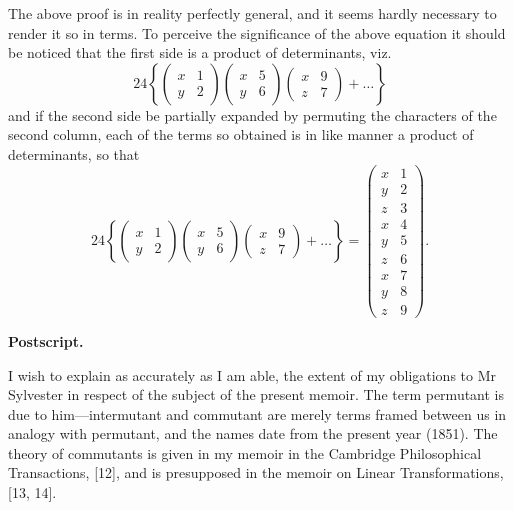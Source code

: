 \documentclass[11pt,a4paper]{article}
\theoremstyle{plain}
\begin{document}
The above proof is in reality perfectly general, and it seems hardly necessary to render it so in terms. To perceive the significance of the above equation it should be noticed that the first side is a product of determinants, viz.
\[24 \left\{ \begin{pmatrix} x & 1 \\ y & 2 \end{pmatrix} \begin{pmatrix} x & 5 \\ y & 6 \end{pmatrix} \begin{pmatrix} x & 9 \\ z & 7 \end{pmatrix} + \ldots \right\}\]
and if the second side be partially expanded by permuting the characters of the second column, each of the terms so obtained is in like manner a product of determinants, so that
\[24 \left\{ \begin{pmatrix} x & 1 \\ y & 2 \end{pmatrix} \begin{pmatrix} x & 5 \\ y & 6 \end{pmatrix} \begin{pmatrix} x & 9 \\ z & 7 \end{pmatrix} + \ldots \right\} = \begin{pmatrix} x & 1 \\ y & 2 \\ z & 3 \\ \hline x & 4 \\ y & 5 \\ z & 6 \\ \hline x & 7 \\ y & 8 \\ z & 9 \end{pmatrix}.\]

\bigskip
\noindent\textbf{Postscript.}

I wish to explain as accurately as I am able, the extent of my obligations to Mr Sylvester in respect of the subject of the present memoir. The term permutant is due to him---intermutant and commutant are merely terms framed between us in analogy with permutant, and the names date from the present year (1851). The theory of commutants is given in my memoir in the Cambridge Philosophical Transactions, [12], and is presupposed in the memoir on Linear Transformations, [13, 14].
\end{document}
